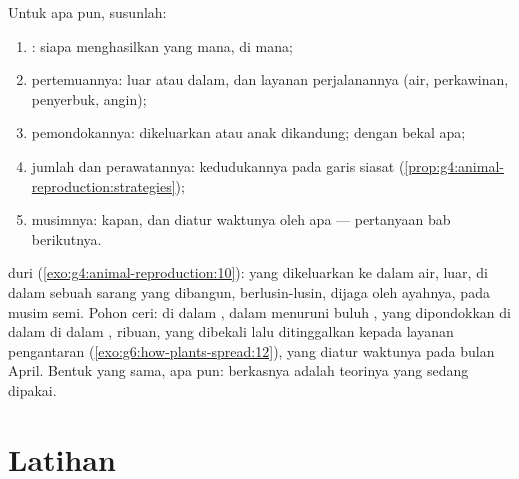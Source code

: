 \begin{method}\label{met:g8:sexual-reproduction:dossier}
Untuk  apa pun, susunlah:
\begin{enumerate}
  \item {}: siapa menghasilkan yang mana, di mana;
  \item pertemuannya:  luar atau dalam, dan layanan
        perjalanannya (air, perkawinan, penyerbuk, angin);
  \item pemondokannya:  dikeluarkan atau anak dikandung; dengan
        bekal apa;
  \item jumlah dan perawatannya: kedudukannya pada garis siasat
        (\cref{prop:g4:animal-reproduction:strategies});
  \item musimnya: kapan, dan diatur waktunya oleh apa --- pertanyaan
        bab berikutnya.
\end{enumerate}
\end{method}

\begin{example}\label{ex:g8:sexual-reproduction:dossiers}
 duri (\cref{exo:g4:animal-reproduction:10}):  yang
dikeluarkan ke dalam air,  luar,  di dalam sebuah sarang
yang dibangun, berlusin-lusin, dijaga oleh ayahnya, pada musim semi.
Pohon ceri:  di dalam ,  dalam menuruni buluh
,  yang dipondokkan di dalam  di dalam ,
ribuan, yang dibekali lalu ditinggalkan kepada layanan pengantaran
 (\cref{exo:g6:how-plants-spread:12}), yang diatur waktunya
pada bulan April. Bentuk yang sama,  apa pun: berkasnya adalah
teorinya yang sedang dipakai.
\end{example}

\section{Latihan}

